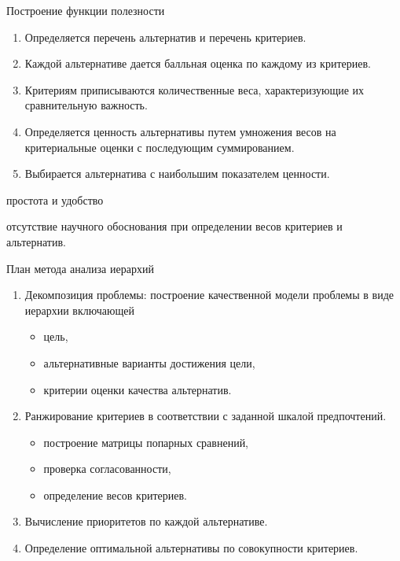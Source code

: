 \documentclass[unicode,11pt,notheorems,xcolor=table]{beamer}
\begin{document}
\begin{frame}[allowframebreaks]{Построение функции полезности}{}
    \begin{enumerate}
        \item Определяется перечень альтернатив и перечень критериев.
        \item Каждой альтернативе дается балльная оценка по каждому из критериев.
        \item Критериям приписываются количественные веса, характеризующие их сравнительную важность. 
        \item Определяется ценность альтернативы путем умножения весов на критериальные оценки с последующим суммированием. 
        \item Выбирается альтернатива с наибольшим показателем ценности. 
    \end{enumerate}
    
    \bigskip
    простота и удобство
        
    \bigskip
    отсутствие научного обоснования при определении весов критериев и альтернатив.                 
\end{frame}
    
\begin{frame}{План метода анализа иерархий}

    \begin{enumerate}
        \item Декомпозиция проблемы: построение качественной модели проблемы в виде иерархии  включающей 
        \begin{itemize}
            \item цель,
            \item альтернативные варианты достижения цели,
            \item критерии оценки качества альтернатив.
        \end{itemize}
        \item Ранжирование критериев в соответствии с заданной шкалой предпочтений. 
        \begin{itemize}
            \item построение матрицы попарных сравнений,
            \item проверка согласованности,
            \item определение весов критериев.
        \end{itemize}
        \item Вычисление приоритетов по каждой альтернативе.            
        \item Определение оптимальной альтернативы по совокупности критериев.
    \end{enumerate}    

\end{frame}
    
\end{document}
